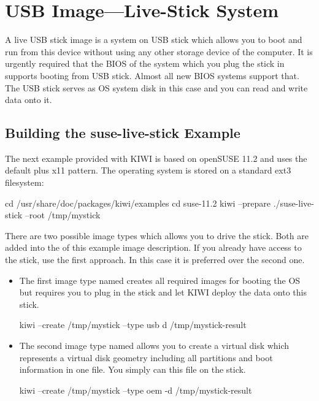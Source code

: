 \chapter{USB Image---Live-Stick System}
\label{chapter:usb}
\minitoc

A live USB stick image is a system on USB stick which allows you to
boot and run from this device without using any other storage device of
the computer. It is urgently required that the BIOS of the system which
you plug the stick in supports booting from USB stick. Almost all
new BIOS systems support that. The USB stick serves as OS system disk
in this case and you can read and write data onto it.

\section{Building the suse-live-stick Example}

The next example provided with KIWI is based on openSUSE 11.2 and uses
the default plus x11 pattern. The operating system is stored on a
standard ext3 filesystem:

\begin{Command}{12cm}
cd /usr/share/doc/packages/kiwi/examples
cd suse-11.2
kiwi --prepare ./suse-live-stick --root /tmp/mystick
\end{Command}

There are two possible image types which allows you to drive the
stick. Both are added into the %
 of this example image
description. If you already have access to the stick, use the first approach.
In this case it is preferred over the second one.

\begin{itemize}
\item The first image type named  creates all required
      images for booting the OS but requires you to plug in the stick
      and let KIWI deploy the data onto this stick.

\begin{Command}{12cm}
kiwi --create /tmp/mystick --type usb d /tmp/mystick-result
\end{Command}

\item The second image type named  allows you to create a
      virtual disk which represents a virtual disk geometry including
      all partitions and boot information in one file. You simply can 
      this file on the stick.

\begin{Command}{12cm}
kiwi --create /tmp/mystick --type oem -d /tmp/mystick-result
\end{Command}
\end{itemize}

